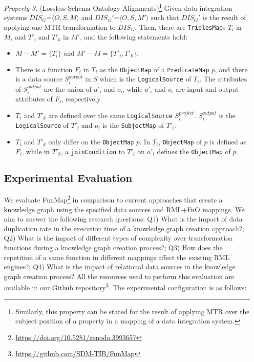 \noindent\textit{Property 3.} (Lossless Schema-Ontology Alignments)\footnote{Similarly, this property can be stated for the result of applying MTR over the subject position of a property in a mapping of a data integration system.}
\label{property:p3}
Given data integration systems $DIS_G$=$\langle O,S,M\rangle$ and  $DIS_G'$=$\langle O,S,M'\rangle$ such that $DIS_G'$ is the result of applying one MTR transformation to $DIS_G$. Then, there are \verb|TriplesMap|s $T_i$ in $M$, 
and  $T'_i$ and $T'_k$ in $M'$, and the following statements hold:
\begin{itemize}
    \item $M - M'=\{T_i\}$ and $M'- M=\{T'_i,T'_k\}$. 
    \item There is a function $F_i$ in $T_i$ as the \verb|ObjectMap| of a  \verb|PredicateMap| $p$, and there is a data source $S_i^{output}$ in $S$ which is the \verb|LogicalSource| of $T_i$. The attributes of $S_i^{output}$ are the union of $a'_i$ and $o_i$, while $a'_i$ and $o_i$ are input and output attributes of $F_i$, respectively.
    \item $T_i$ and $T'_k$ are defined over the same \verb|LogicalSource|  $S_i^{project}$. $S_i^{output}$ is the \verb|LogicalSource| of $T'_i$ and $o_i$ is the \verb|SubjectMap| of $T'_i$.  
    \item $T_i$ and $T'_k$ only differ on the \verb|ObjectMap| $p$. In $T_i$, \verb|ObjectMap| of $p$ is defined as $F_i$, while in $T'_k$, a \verb|joinCondition| to $T'_i$ on $a'_i$ defines the \verb|ObjectMap| of $p$. 
\end{itemize}


\subsection{Experimental Evaluation}
\label{sec:eval}
We evaluate FunMap\footnote{\url{https://doi.org/10.5281/zenodo.3993657}} in comparison to current approaches that create a knowledge graph using the specified data sources and RML+FnO mappings. We aim to answer the following research questions: 
Q1) What is the impact of data duplication rate in the execution time of a knowledge graph creation approach?; Q2) What is the impact of different types of complexity over transformation functions during a knowledge graph creation process?; Q3) How does the repetition of a same function in different mappings affect the existing RML engines?; Q4) What is the impact of relational data sources in the knowledge graph creation process?
All the resources used to perform this evaluation are available in our Github repository\footnote{\url{https://github.com/SDM-TIB/FunMap}}. The experimental configuration is as follows:


